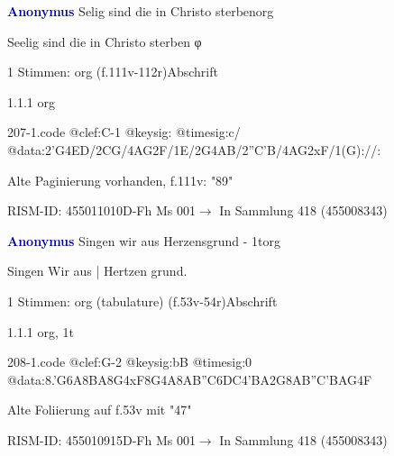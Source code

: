 \documentclass[twocolumn, 12pt]{book}
\begin{document}
\par \vspace{16pt} \textcolor{darkblue}{\textbf{Anonymus  }}\hfillplus{\textbf{[207]}}\newline Selig sind die in Christo sterben\newline org
\par \begin{itshape} Seelig sind die in Christo sterben φ\end{itshape} 
\par \textcolor{darkblue}{}  1 Stimmen: org  (f.111v-112r)\newline Abschrift
\par 1.1.1  org  
\begin{filecontents*}{207-1.code}
@clef:C-1
@keysig:
@timesig:c/
@data:2'G4ED/2CG/4AG2F/1E/2G4AB/2''C'B/4AG2xF/1(G)://:
\end{filecontents*}
\newline %
\par Alte Paginierung vorhanden, f.111v: "89"
\par RISM-ID: 455011010\newline D-Fh  Ms 001\newline $\rightarrow$ In Sammlung 418 (455008343)
      
\par \vspace{16pt} \textcolor{darkblue}{\textbf{Anonymus  }}\hfillplus{\textbf{[208]}}\newline Singen wir aus Herzensgrund - 1t\newline org
\par \begin{itshape}[f.53v, at left:] Singen Wir aus | Hertzen grund.\end{itshape} 
\par \textcolor{darkblue}{}  1 Stimmen: org (tabulature)  (f.53v-54r)\newline Abschrift
\par 1.1.1  org, 1t  
\begin{filecontents*}{208-1.code}
@clef:G-2
@keysig:bB
@timesig:0
@data:8.'G6A{8BA}8G4xF8G4A{8AB''C6DC}4'BA2G{8AB''C'B}{AG}4F
\end{filecontents*}
\newline %
\par Alte Foliierung auf f.53v mit "47"
\par RISM-ID: 455010915\newline D-Fh  Ms 001\newline $\rightarrow$ In Sammlung 418 (455008343)
      
\end{document}
